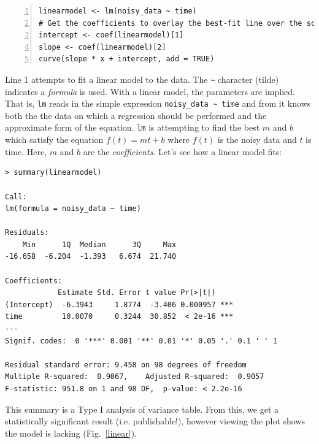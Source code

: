 \documentclass[12pt]{article}
\theoremstyle{remark}
\begin{document}
\begin{Verbatim}[frame=single, fontsize=\small, numbers=left]
linearmodel <- lm(noisy_data ~ time)
# Get the coefficients to overlay the best-fit line over the scatterplot
intercept <- coef(linearmodel)[1]
slope <- coef(linearmodel)[2]
curve(slope * x + intercept, add = TRUE)
\end{Verbatim}

Line 1 attempts to fit a linear model to the data. The \verb|~| character (tilde) indicates a \emph{formula} is used. With a linear model, the parameters are implied. That is, \verb|lm| reads in the simple expression \verb|noisy_data ~ time| and from it knows both the the data on which a regression should be performed and the approximate form of the equation. \verb|lm| is attempting to find the best $m$ and $b$ which satisfy the equation $f(t) = mt + b$ where $f(t)$ is the noisy data and $t$ is time. Here, $m$ and $b$ are the \emph{coefficients}. Let's see how a linear model fits:

\begin{Verbatim}[frame=single, fontsize=\small]
> summary(linearmodel)

Call:
lm(formula = noisy_data ~ time)

Residuals:
    Min      1Q  Median      3Q     Max 
-16.658  -6.204  -1.393   6.674  21.740 

Coefficients:
            Estimate Std. Error t value Pr(>|t|)    
(Intercept)  -6.3943     1.8774  -3.406 0.000957 ***
time         10.0070     0.3244  30.852  < 2e-16 ***
---
Signif. codes:  0 '***' 0.001 '**' 0.01 '*' 0.05 '.' 0.1 ' ' 1

Residual standard error: 9.458 on 98 degrees of freedom
Multiple R-squared:  0.9067,	Adjusted R-squared:  0.9057 
F-statistic: 951.8 on 1 and 98 DF,  p-value: < 2.2e-16
\end{Verbatim}
This summary is a Type I analysis of variance table. From this, we get a statistically significant result (i.e. publishable!), however viewing the plot shows the model is lacking (Fig.~\ref{linear}).
\end{document}
